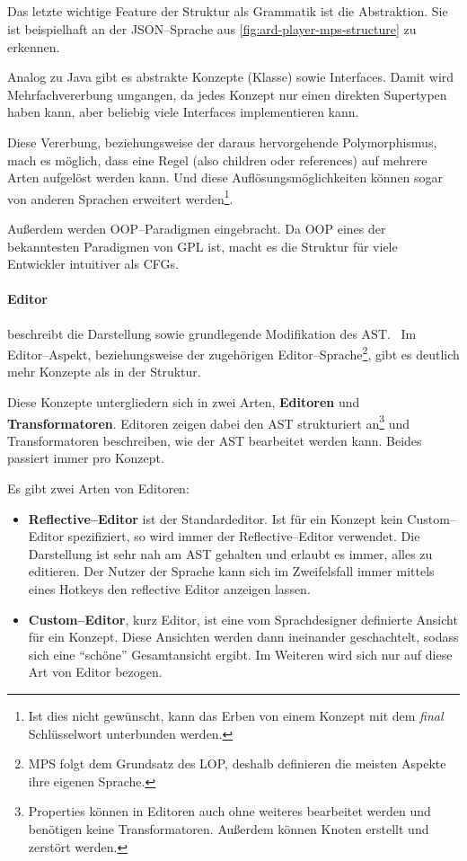\subparagraph*{}
Das letzte wichtige Feature der Struktur als Grammatik ist die Abstraktion.
Sie ist beispielhaft an der \ac{JSON}--Sprache aus \autoref{fig:ard-player-mps-structure} zu erkennen.

Analog zu Java gibt es abstrakte Konzepte (Klasse) sowie Interfaces.
Damit wird Mehrfachvererbung umgangen, da jedes Konzept nur einen direkten Supertypen haben kann, aber beliebig viele Interfaces implementieren kann.

Diese Vererbung, beziehungsweise der daraus hervorgehende Polymorphismus, mach es möglich, dass eine Regel (also {\ttfamily children} oder {\ttfamily references}) auf mehrere Arten aufgelöst werden kann.
Und diese Auflösungsmöglichkeiten können sogar von anderen Sprachen erweitert werden\footnote{Ist dies nicht gewünscht, kann das Erben von einem Konzept mit dem \textit{final} Schlüsselwort unterbunden werden.}.

Außerdem werden \acs{OOP}--Paradigmen eingebracht.
Da \ac{OOP} eines der bekanntesten Paradigmen von \ac{GPL} ist, macht es die Struktur für viele Entwickler intuitiver als \acp{CFG}.

\paragraph{Editor} beschreibt die Darstellung sowie grundlegende Modifikation des \ac{AST}.~\autocite{jetbrains-sro-no-dateH}
Im Editor--Aspekt, beziehungsweise der zugehörigen Editor--Sprache\footnote{\ac{MPS} folgt dem Grundsatz des \ac{LOP}, deshalb definieren die meisten Aspekte ihre eigenen Sprache.}, gibt es deutlich mehr Konzepte als in der Struktur.

Diese Konzepte untergliedern sich in zwei Arten, \textbf{Editoren} und \textbf{Transformatoren}.
Editoren zeigen dabei den \ac{AST} strukturiert an\footnote{Properties können in Editoren auch ohne weiteres bearbeitet werden und benötigen keine Transformatoren. Außerdem können Knoten erstellt und zerstört werden.} und Transformatoren beschreiben, wie der \ac{AST} bearbeitet werden kann.
Beides passiert immer pro Konzept.

Es gibt zwei Arten von Editoren:
\begin{itemize}
    \item \textbf{Reflective--Editor} ist der Standardeditor.
    Ist für ein Konzept kein Custom--Editor spezifiziert, so wird immer der Reflective--Editor verwendet.
    Die Darstellung ist sehr nah am \ac{AST} gehalten und erlaubt es immer, alles zu editieren.
    Der Nutzer der Sprache kann sich im Zweifelsfall immer mittels eines Hotkeys den reflective Editor anzeigen lassen.
    \item \textbf{Custom--Editor}, kurz Editor, ist eine vom Sprachdesigner definierte Ansicht für ein Konzept.
    Diese Ansichten werden dann ineinander geschachtelt, sodass sich eine \enquote{schöne} Gesamtansicht ergibt.
    Im Weiteren wird sich nur auf diese Art von Editor bezogen.
\end{itemize}

